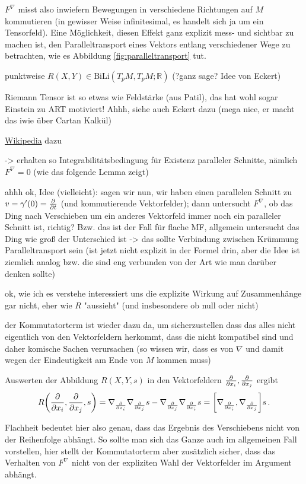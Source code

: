 \documentclass[../H_Analysis_main.tex]{subfiles}
\begin{document}
$F^\nabla$ misst also inwiefern Bewegungen in verschiedene Richtungen auf $M$ kommutieren (in gewisser Weise infinitesimal, es handelt sich ja um ein Tensorfeld). Eine Möglichkeit, diesen Effekt ganz explizit mess- und sichtbar zu machen ist, den Paralleltransport eines Vektors entlang verschiedener Wege zu betrachten, wie es Abbildung \ref{fig:paralleltransport} tut.


punktweise $R(X, Y) \in \text{BiLi}(T_p M, T_p M; \mathbb{R})$ (?ganz sage? Idee von Eckert)



Riemann Tensor ist so etwas wie Feldstärke (aus Patil), das hat wohl sogar Einstein zu ART motiviert! Ahhh, siehe auch Eckert dazu (mega nice, er macht das iwie über Cartan Kalkül)

\href{https://de.wikipedia.org/wiki/Riemannscher_Kr%C3%BCmmungstensor}{Wikipedia} dazu

-> erhalten so Integrabilitätsbedingung für Existenz paralleler Schnitte, nämlich $F^\nabla = 0$ (wie das folgende Lemma zeigt)


ahhh ok, Idee (vielleicht): sagen wir nun, wir haben einen parallelen Schnitt zu $v = \gamma'(0) = \pdv{t}$ (und kommutierende Vektorfelder); dann untersucht $F^\nabla$, ob das Ding nach Verschieben um ein anderes Vektorfeld immer noch ein paralleler Schnitt ist, richtig? Bzw. das ist der Fall für flache MF, allgemein untersucht das Ding wie groß der Unterschied ist -> das sollte Verbindung zwischen Krümmung Paralleltransport sein (ist jetzt nicht explizit in der Formel drin, aber die Idee ist ziemlich analog bzw. die sind eng verbunden von der Art wie man darüber denken sollte)


ok, wie ich es verstehe interessiert uns die explizite Wirkung auf Zusammenhänge gar nicht, eher wie $R$ "aussieht" (und insbesondere ob null oder nicht)

der Kommutatorterm ist wieder dazu da, um sicherzustellen dass das alles nicht eigentlich von den Vektorfeldern herkommt, dass die nicht kompatibel sind und daher komische Sachen verursachen (so wissen wir, dass es von $\nabla$ und damit wegen der Eindeutigkeit am Ende von $M$ kommen muss)


\begin{bsp}
Auswerten der Abbildung $R(X, Y, s)$ in den Vektorfeldern $\pdv{x_i}, \pdv{x_j}$ ergibt
\begin{equation*}
R\qty(\pdv{x_i}, \pdv{x_j}, s) = \nabla_{\pdv{x_i}} \nabla_{\pdv{x_j}} s - \nabla_{\pdv{x_j}} \nabla_{\pdv{x_i}} s = \qty[\nabla_{\pdv{x_i}}, \nabla_{\pdv{x_j}}] s \, .
\end{equation*}

Flachheit bedeutet hier also genau, dass das Ergebnis des Verschiebens nicht von der Reihenfolge abhängt. So sollte man sich das Ganze auch im allgemeinen Fall vorstellen, hier stellt der Kommutatorterm aber zusätzlich sicher, dass das Verhalten von $F^\nabla$ nicht von der expliziten Wahl der Vektorfelder im Argument abhängt.
\end{bsp}
\end{document}
